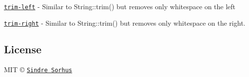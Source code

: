 \begin{DoxyItemize}
\item \href{https://github.com/sindresorhus/trim-left}{\tt trim-\/left} -\/ Similar to {\ttfamily String\+::trim()} but removes only whitespace on the left
\item \href{https://github.com/sindresorhus/trim-right}{\tt trim-\/right} -\/ Similar to {\ttfamily String\+::trim()} but removes only whitespace on the right.
\end{DoxyItemize}

\subsection*{License}

M\+IT © \href{http://sindresorhus.com}{\tt Sindre Sorhus} 